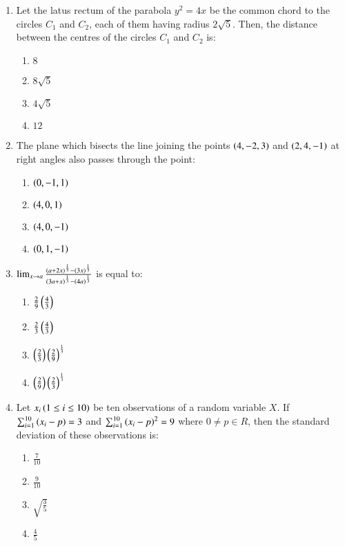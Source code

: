 \documentclass[journal,9pt,twocolumn]{IEEEtran}
\begin{document}
\begin{enumerate}
\item Let the latus rectum of the parabola $y^2 = 4x$ be the common chord to the circles $C_1$ and $C_2$, each of them having radius $2\sqrt{5}$. Then, the distance between the centres of the circles $C_1$ and $C_2$ is:

\begin{multicols}{4}
\begin{enumerate}
    \item $8$
    \item $8\sqrt{5}$
    \item $4\sqrt{5}$
    \item $12$
\end{enumerate}
\end{multicols}

\item The plane which bisects the line joining the points $\left(4, -2, 3\right)$ and $\left(2, 4, -1\right)$ at right angles also passes through the point:

\begin{multicols}{2}
\begin{enumerate}
    \item $\left(0, -1, 1\right)$
    \item $\left(4, 0, 1\right)$
    \item $\left(4, 0, -1\right)$
    \item $\left(0, 1, -1\right)$
\end{enumerate}
\end{multicols}

\item $\lim_{x \to a} \frac{\left(a + 2x\right)^{\frac{1}{3}} - \left(3x\right)^{\frac{1}{3}}}{\left(3a + x\right)^{\frac{1}{3}} - \left(4a\right)^{\frac{1}{3}}}$ is equal to:
\begin{multicols}{2}
\begin{enumerate}
    \item $\frac{2}{9} \left(\frac{4}{3}\right)$
    \item $\frac{2}{3} \left(\frac{4}{3}\right)$
    \item $\left(\frac{2}{3}\right) \left(\frac{2}{9}\right)^{\frac{1}{3}}$
    \item $\left(\frac{2}{9}\right) \left(\frac{2}{3}\right)^{\frac{1}{3}}$
\end{enumerate}
\end{multicols}

\item Let $x_{i} \left(1 \leq i \leq 10\right)$ be ten observations of a random variable $X$. If
$\sum_{i=1}^{10}\left(x_{i}-p\right)=3$
and
$\sum_{i=1}^{10}\left(x_{i}-p\right)^{2}=9$
where $0 \neq p \in R$, then the standard deviation of these observations is:
\begin{multicols}{4}
\begin{enumerate}
    \item  $\frac{7}{10}$
    \item $\frac{9}{10}$
    \item $\sqrt{\frac{3}{5}}$
    \item  $\frac{4}{5}$
\end{enumerate}
\end{multicols}


\end{enumerate}
\end{document}
